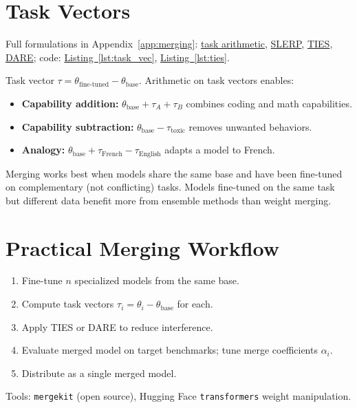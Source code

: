 \section{Task Vectors}

Full formulations in Appendix~\ref{app:merging}: \hyperref[form:task_vec]{task arithmetic}, \hyperref[form:slerp]{SLERP}, \hyperref[form:ties]{TIES}, \hyperref[form:dare]{DARE}; code: \hyperref[lst:task_vec]{Listing~\ref*{lst:task_vec}}, \hyperref[lst:ties]{Listing~\ref*{lst:ties}}.

Task vector \parencite{ilharco2022editing} $\tau = \theta_\text{fine-tuned} - \theta_\text{base}$. Arithmetic on task vectors enables:
\begin{itemize}
  \item \textbf{Capability addition:} $\theta_\text{base} + \tau_A + \tau_B$ combines coding and math capabilities.
  \item \textbf{Capability subtraction:} $\theta_\text{base} - \tau_\text{toxic}$ removes unwanted behaviors.
  \item \textbf{Analogy:} $\theta_\text{base} + \tau_\text{French} - \tau_\text{English}$ adapts a model to French.
\end{itemize}

\begin{keyinsight}
Merging works best when models share the same base and have been fine-tuned on complementary (not conflicting) tasks. Models fine-tuned on the same task but different data benefit more from ensemble methods than weight merging.
\end{keyinsight}

\section{Practical Merging Workflow}

\begin{enumerate}
  \item Fine-tune $n$ specialized models from the same base.
  \item Compute task vectors $\tau_i = \theta_i - \theta_\text{base}$ for each.
  \item Apply TIES or DARE to reduce interference.
  \item Evaluate merged model on target benchmarks; tune merge coefficients $\alpha_i$.
  \item Distribute as a single merged model.
\end{enumerate}

Tools: \texttt{mergekit} \parencite{ilharco2022editing} (open source), Hugging Face \texttt{transformers} weight manipulation.
